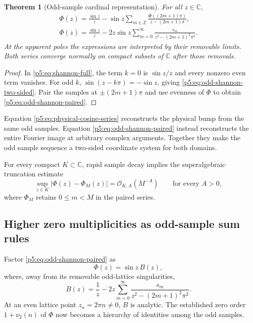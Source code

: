 \documentclass[11pt,oneside]{article}
\newtheorem{theorem}{Theorem}[section]
\theoremstyle{definition}
\newcommand{\C}{\mathbb C}
\newcommand{\Z}{\mathbb Z}
\newcommand{\vtwo}{\nu_2}
\newcommand{\bigO}{\mathcal O}
\begin{document}
\begin{theorem}[Odd-sample cardinal representation]
\label{p5:thm:odd-shannon}
For all $z\in\C$,
\begin{align}
 \boxed{\displaystyle
 \Phi(z)=\frac{\sin z}{z}
 -\sin z\sum_{m\in\Z}
 \frac{\Phi((2m+1)\pi)}{z-(2m+1)\pi},}                 \label{p5:eq:odd-shannon-two-sided}\\
 \boxed{\displaystyle
 \Phi(z)=\frac{\sin z}{z}
 -2z\sin z\sum_{m=0}^\infty
 \frac{s_m}{z^2-(2m+1)^2\pi^2}.}                        \label{p5:eq:odd-shannon-paired}
\end{align}
At the apparent poles the expressions are interpreted by their removable
limits.  Both series converge normally on compact subsets of $\C$ after those
removals.
\end{theorem}

\begin{proof}
In \eqref{p5:eq:shannon-full}, the term $k=0$ is $\sin z/z$ and every nonzero
even term vanishes.  For odd $k$,
$\sin(z-k\pi)=-\sin z$, giving
\eqref{p5:eq:odd-shannon-two-sided}.  Pair the samples at $\pm(2m+1)\pi$ and use
evenness of $\Phi$ to obtain \eqref{p5:eq:odd-shannon-paired}.
\end{proof}

\newresult Equation \eqref{p5:eq:physical-cosine-series} reconstructs the
physical bump from the same odd samples.  Equation
\eqref{p5:eq:odd-shannon-paired} instead reconstructs the entire Fourier image
at arbitrary complex arguments.  Together they make the odd sample sequence
a two-sided coordinate system for both domains.

For every compact $K\subset\C$, rapid sample decay implies the superalgebraic
truncation estimate
\begin{equation}
 \sup_{z\in K}|\Phi(z)-\Phi_M(z)|=\bigO_{K,A}(M^{-A})
 \qquad\text{for every }A>0,                             \label{p5:eq:shannon-superalgebraic}
\end{equation}
where $\Phi_M$ retains $0\le m<M$ in the paired series.

\subsection{Higher zero multiplicities as odd-sample sum rules}

Factor \eqref{p5:eq:odd-shannon-paired} as
\begin{equation}
 \Phi(z)=\sin z\,B(z),                                   \label{p5:eq:Phi-sin-B}
\end{equation}
where, away from its removable odd-lattice singularities,
\begin{equation}
 B(z)=\frac1z-2z\sum_{m=0}^\infty
 \frac{s_m}{z^2-(2m+1)^2\pi^2}.                          \label{p5:eq:B-definition}
\end{equation}
At an even lattice point $z_n=2\pi n\ne0$, $B$ is analytic.  The established
zero order $1+\vtwo(n)$ of $\Phi$ now becomes a hierarchy of identities among
the odd samples.
\end{document}
